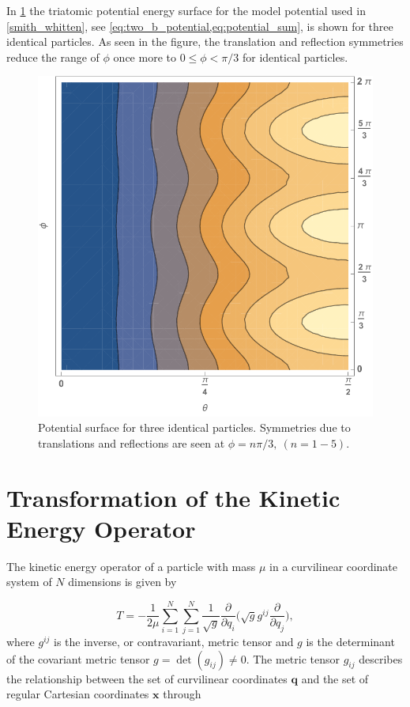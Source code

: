 In \cref{fig:potential} the triatomic potential energy surface for the model potential used in \cref{smith_whitten}, see \cref{eq:two_b_potential,eq:potential_sum}, is shown for three identical particles. As seen in the figure, the translation and reflection symmetries reduce the range of $\phi$ once more to $0 \leq \phi < \pi/3$ for identical particles. 

\begin{figure}[!b]
	\centering
	\includegraphics[width=0.60\linewidth]{potential.pdf}
	\caption{Potential surface for three identical particles. Symmetries due to translations and reflections are seen at $\phi = n\pi/3, \ (n = 1-5)$.}
	\label{fig:potential}
\end{figure}

\section{Transformation of the Kinetic Energy Operator}\label{Appendix_2_2}
The kinetic energy operator of a particle with mass $\mu$ in a curvilinear coordinate system of $N$ dimensions is given by \cite{podolsky_1928}

\begin{equation}\label{eq:kinetic_e_op}
T = -\frac{1}{2\mu} \sum_{i=1}^{N} \sum_{j=1}^{N} \frac{1}{\sqrt{g}} \frac{\partial}{\partial q_i} \bigg(\sqrt{g} g^{ij} \frac{\partial}{\partial q_j}\bigg),
\end{equation}
where $g^{ij}$ is the inverse, or contravariant, metric tensor and $g$ is the determinant of the covariant metric tensor $g = \det(g_{ij}) \neq 0$. The metric tensor $g_{ij}$ describes the relationship between the set of curvilinear coordinates $\mathbf{q}$ and the set of regular Cartesian coordinates $\mathbf{x}$ through

